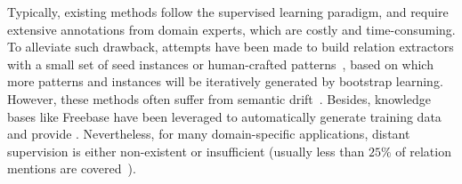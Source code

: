 Typically, existing methods follow the supervised learning paradigm, and require extensive annotations from domain experts, which are costly and time-consuming.
To alleviate such drawback, attempts have been made to build relation extractors with a small set of seed instances or human-crafted patterns~\cite{nakashole2011scalable,carlson2010coupled}, 
based on which more patterns and instances will be iteratively generated by bootstrap learning.
However, these methods often suffer from semantic drift~\cite{mintz2009distant}.
Besides, knowledge bases like Freebase have been leveraged to automatically generate training data and provide \ds\cite{mintz2009distant}.
Nevertheless, for many domain-specific applications, distant supervision is either non-existent or insufficient (usually less than $25\%$ of relation mentions are covered~\cite{ren2015clustype,ling2012fine}).


